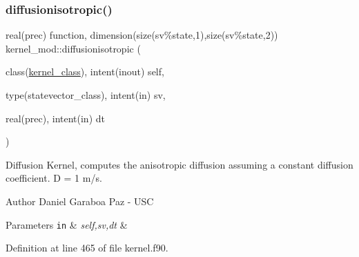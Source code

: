 \subsubsection{\texorpdfstring{diffusionisotropic()}{diffusionisotropic()}}
{\footnotesize\ttfamily real(prec) function, dimension(size(sv\%state,1),size(sv\%state,2)) kernel\+\_\+mod\+::diffusionisotropic (\begin{DoxyParamCaption}\item[{class(\mbox{\hyperlink{structkernel__mod_1_1kernel__class}{kernel\+\_\+class}}), intent(inout)}]{self,  }\item[{type(statevector\+\_\+class), intent(in)}]{sv,  }\item[{real(prec), intent(in)}]{dt }\end{DoxyParamCaption})}



Diffusion Kernel, computes the anisotropic diffusion assuming a constant diffusion coefficient. D = 1 m/s. 

\begin{DoxyAuthor}{Author}
Daniel Garaboa Paz -\/ U\+SC 
\end{DoxyAuthor}

\begin{DoxyParams}[1]{Parameters}
\mbox{\tt in}  & {\em self,sv,dt} & \\
\hline
\end{DoxyParams}


Definition at line 465 of file kernel.\+f90.


